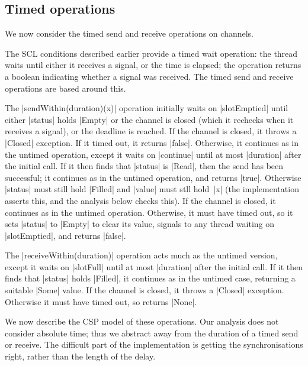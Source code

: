 
\subsection{Timed operations}
\label{sec:syncchan-timed}

\inlineScala

We now consider the timed send and receive operations on channels.  

The SCL conditions described earlier provide a timed wait operation: the
thread waits until either it receives a signal, or the time is elapsed; the
operation returns a boolean indicating whether a signal was received.  The
timed send and receive operations are based around this. 

The |sendWithin(duration)(x)| operation initially waits on |slotEmptied| until
either |status| holds |Empty| or the channel is closed (which it rechecks when
it receives a signal), or the deadline is reached.  If the channel is closed,
it throws a |Closed| exception.  If it timed out, it returns |false|.
Otherwise, it continues as in the untimed operation, except it waits on
|continue| until at most |duration| after the initial call.  If it then finds
that |status| is |Read|, then the send has been successful; it continues as in
the untimed operation, and returns |true|.  Otherwise |status| must still hold
|Filled| and |value| must stll hold~|x| (the implementation asserts this, and
the analysis below checks this).  If the channel is closed, it continues as in
the untimed operation.  Otherwise, it must have timed out, so it sets |status|
to |Empty| to clear its value, signals to any thread waiting on |slotEmptied|,
and returns |false|.

The |receiveWithin(duration)| operation acts much as the untimed version,
except it waits on |slotFull| until at most |duration| after the initial
call.  If it then finds that |status| holds |Filled|, it continues as in the
untimed case, returning a suitable |Some| value.  If the channel is closed, it
throws a |Closed| exception.  Otherwise it must have timed out, so returns
|None|.  


We now describe the CSP model of these operations.  Our analysis does not
consider absolute time; thus we abstract away from the duration of a timed
send or receive.  The difficult part of the implementation is getting the
synchronisations right, rather than the length of the delay. 

